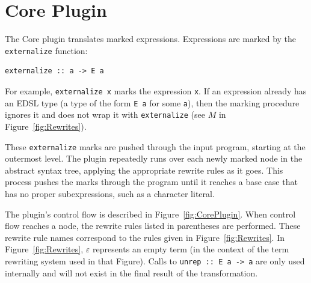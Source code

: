 \documentclass[runningheads, a4paper]{llncs}
\newcommand{\ttt}{\texttt}
\begin{document}


\section{Core Plugin}
\label{sec:CorePlugin}

The Core plugin translates marked expressions. Expressions are marked by
the \ttt{externalize} function:

\begin{lstlisting}
externalize :: a -> E a
\end{lstlisting}

For example, \ttt{externalize x} marks the expression \ttt{x}.  If an expression
already has an EDSL type (a type of the form \ttt{E a} for some \ttt{a}), then
the marking procedure ignores it and does not wrap it with \ttt{externalize}
(see $M$ in Figure~\ref{fig:Rewrites}).

These \verb|externalize| marks are pushed through the input program, starting at
the outermost level. The plugin repeatedly runs over each newly marked node in
the abstract syntax tree, applying the appropriate rewrite rules as it goes.
This process pushes the marks through the program until it reaches a base case
that has no proper subexpressions, such as a character literal.

The plugin's control flow is described in Figure~\ref{fig:CorePlugin}. When control
flow reaches a node, the rewrite rules listed in parentheses are performed. These rewrite
rule names correspond to the rules given in Figure~\ref{fig:Rewrites}.
In Figure~\ref{fig:Rewrites},
$\varepsilon$ represents an empty term (in the context of the term rewriting system used in that Figure). Calls
to \ttt{unrep :: E a -> a} are only used internally and will not exist in
the final result of the transformation.
\end{document}
